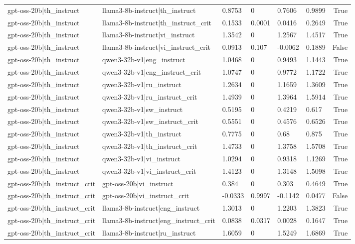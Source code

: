 \begin{table}
\begin{tabular}{llllllr}
gpt-oss-20b|th_instruct & llama3-8b-instruct|th_instruct & 0.8753 & 0 & 0.7606 & 0.9899 & True \\
gpt-oss-20b|th_instruct & llama3-8b-instruct|th_instruct_crit & 0.1533 & 0.0001 & 0.0416 & 0.2649 & True \\
gpt-oss-20b|th_instruct & llama3-8b-instruct|vi_instruct & 1.3542 & 0 & 1.2567 & 1.4517 & True \\
gpt-oss-20b|th_instruct & llama3-8b-instruct|vi_instruct_crit & 0.0913 & 0.107 & -0.0062 & 0.1889 & False \\
gpt-oss-20b|th_instruct & qwen3-32b-v1|eng_instruct & 1.0468 & 0 & 0.9493 & 1.1443 & True \\
gpt-oss-20b|th_instruct & qwen3-32b-v1|eng_instruct_crit & 1.0747 & 0 & 0.9772 & 1.1722 & True \\
gpt-oss-20b|th_instruct & qwen3-32b-v1|ru_instruct & 1.2634 & 0 & 1.1659 & 1.3609 & True \\
gpt-oss-20b|th_instruct & qwen3-32b-v1|ru_instruct_crit & 1.4939 & 0 & 1.3964 & 1.5914 & True \\
gpt-oss-20b|th_instruct & qwen3-32b-v1|sw_instruct & 0.5195 & 0 & 0.4219 & 0.617 & True \\
gpt-oss-20b|th_instruct & qwen3-32b-v1|sw_instruct_crit & 0.5551 & 0 & 0.4576 & 0.6526 & True \\
gpt-oss-20b|th_instruct & qwen3-32b-v1|th_instruct & 0.7775 & 0 & 0.68 & 0.875 & True \\
gpt-oss-20b|th_instruct & qwen3-32b-v1|th_instruct_crit & 1.4733 & 0 & 1.3758 & 1.5708 & True \\
gpt-oss-20b|th_instruct & qwen3-32b-v1|vi_instruct & 1.0294 & 0 & 0.9318 & 1.1269 & True \\
gpt-oss-20b|th_instruct & qwen3-32b-v1|vi_instruct_crit & 1.4123 & 0 & 1.3148 & 1.5098 & True \\
gpt-oss-20b|th_instruct_crit & gpt-oss-20b|vi_instruct & 0.384 & 0 & 0.303 & 0.4649 & True \\
gpt-oss-20b|th_instruct_crit & gpt-oss-20b|vi_instruct_crit & -0.0333 & 0.9997 & -0.1142 & 0.0477 & False \\
gpt-oss-20b|th_instruct_crit & llama3-8b-instruct|eng_instruct & 1.3013 & 0 & 1.2203 & 1.3823 & True \\
gpt-oss-20b|th_instruct_crit & llama3-8b-instruct|eng_instruct_crit & 0.0838 & 0.0317 & 0.0028 & 0.1647 & True \\
gpt-oss-20b|th_instruct_crit & llama3-8b-instruct|ru_instruct & 1.6059 & 0 & 1.5249 & 1.6869 & True \\

\end{tabular}
\end{table}
